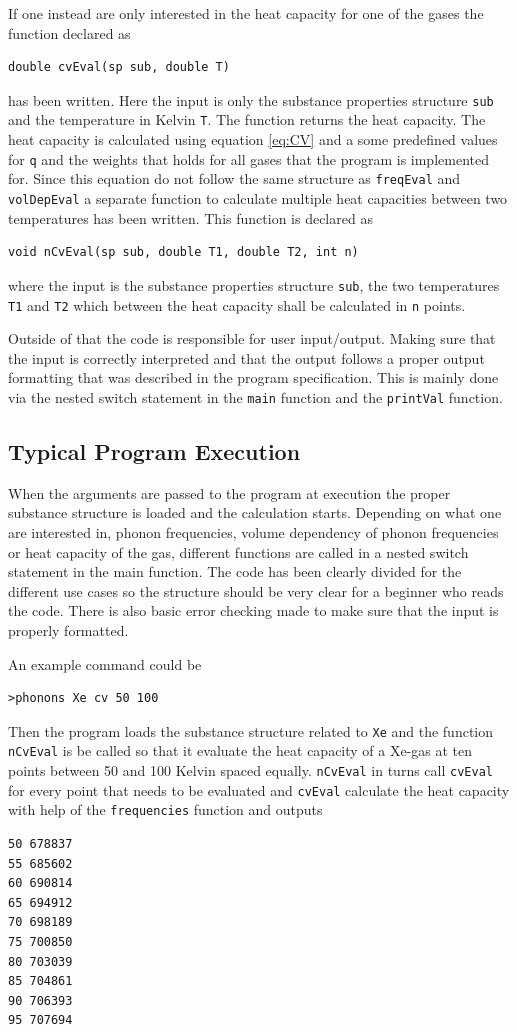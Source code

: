 \documentclass[11pt]{article}
\begin{document}
If one instead are only interested in the heat capacity for one of the gases the function declared as
\begin{lstlisting}
double cvEval(sp sub, double T)
\end{lstlisting} 
has been written. Here the input is only the substance properties structure \verb+sub+ and the temperature in Kelvin \verb+T+. The function returns the heat capacity. The heat capacity is calculated using equation \ref{eq:CV} and a some predefined values for \verb+q+ and the weights that holds for all gases that the program is implemented for. Since this equation do not follow the same structure as \verb+freqEval+ and \verb+volDepEval+ a separate function to calculate multiple heat capacities between two temperatures has been written. This function is declared as
\begin{lstlisting}
void nCvEval(sp sub, double T1, double T2, int n)
\end{lstlisting}
where the input is the substance properties structure \verb+sub+, the two temperatures \verb+T1+ and \verb+T2+ which between the heat capacity shall be calculated in \verb+n+ points.  

Outside of that the code is responsible for user input/output. Making sure that the input is correctly interpreted and that the output follows a proper output formatting that was described in the program specification. This is mainly done via the nested switch statement in the \verb+main+ function and the \verb+printVal+ function.

\subsection{Typical Program Execution}
When the arguments are passed to the program at execution the proper substance structure is loaded and the calculation starts. Depending on what one are interested in, phonon frequencies, volume dependency of phonon frequencies or heat capacity of the gas, different functions are called in a nested switch statement in the main function. The code has been clearly divided for the different use cases so the structure should be very clear for a beginner who reads the code. There is also basic error checking made to make sure that the input is properly formatted.

An example command could be
\begin{lstlisting}
>phonons Xe cv 50 100
\end{lstlisting}
Then the program loads the substance structure related to \verb+Xe+ and the function \verb+nCvEval+ is be called so that it evaluate the heat capacity of a Xe-gas at ten points between 50 and 100 Kelvin spaced equally. \verb+nCvEval+ in turns call \verb+cvEval+ for every point that needs to be evaluated and \verb+cvEval+ calculate the heat capacity with help of the \verb+frequencies+ function and outputs
\begin{lstlisting}
50 678837
55 685602
60 690814
65 694912
70 698189
75 700850
80 703039
85 704861
90 706393
95 707694
\end{lstlisting}
\end{document}
